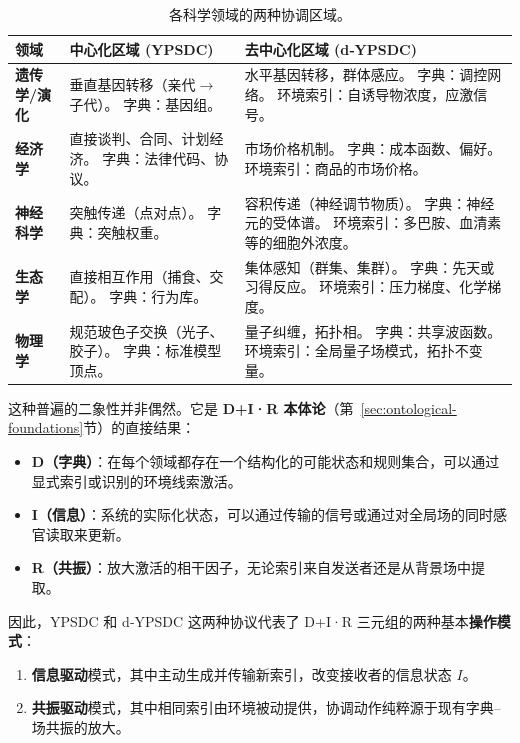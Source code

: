 \documentclass[11pt,a4paper]{article}
\begin{document}
	\begin{table}[htbp]
		\centering
		\caption{各科学领域的两种协调区域。}
		\label{tab:two-regimes-sciences}
		\large
		\begin{tabular}{p{3.0cm}p{5.5cm}p{6.5cm}}
			\toprule
			\textbf{领域} & \textbf{中心化区域 (YPSDC)} & \textbf{去中心化区域 (d‑YPSDC)} \\
			\midrule
			\textbf{遗传学/演化} &
			垂直基因转移（亲代$\to$子代）。
			字典：基因组。 &
			水平基因转移，群体感应。
			字典：调控网络。
			环境索引：自诱导物浓度，应激信号。 \\
			\midrule
			\textbf{经济学} &
			直接谈判、合同、计划经济。
			字典：法律代码、协议。 &
			市场价格机制。
			字典：成本函数、偏好。
			环境索引：商品的市场价格。 \\
			\midrule
			\textbf{神经科学} &
			突触传递（点对点）。
			字典：突触权重。 &
			容积传递（神经调节物质）。
			字典：神经元的受体谱。
			环境索引：多巴胺、血清素等的细胞外浓度。 \\
			\midrule
			\textbf{生态学} &
			直接相互作用（捕食、交配）。
			字典：行为库。 &
			集体感知（群集、集群）。
			字典：先天或习得反应。
			环境索引：压力梯度、化学梯度。 \\
			\midrule
			\textbf{物理学} &
			规范玻色子交换（光子、胶子）。
			字典：标准模型顶点。 &
			量子纠缠，拓扑相。
			字典：共享波函数。
			环境索引：全局量子场模式，拓扑不变量。 \\
			\bottomrule
		\end{tabular}
	\end{table}
	
	\medskip
	\noindent
	这种普遍的二象性并非偶然。它是 \textbf{D+I·R 本体论}（第~\ref{sec:ontological-foundations}节）的直接结果：
	\begin{itemize}[leftmargin=*]
		\item \textbf{D（字典）}：在每个领域都存在一个结构化的可能状态和规则集合，可以通过显式索引或识别的环境线索激活。
		\item \textbf{I（信息）}：系统的实际化状态，可以通过传输的信号或通过对全局场的同时感官读取来更新。
		\item \textbf{R（共振）}：放大激活的相干因子，无论索引来自发送者还是从背景场中提取。
	\end{itemize}
	
	因此，YPSDC 和 d‑YPSDC 这两种协议代表了 D+I·R 三元组的两种基本\textbf{操作模式}：
	\begin{enumerate}[leftmargin=*]
		\item \textbf{信息驱动}模式，其中主动生成并传输新索引，改变接收者的信息状态 \(I\)。
		\item \textbf{共振驱动}模式，其中相同索引由环境被动提供，协调动作纯粹源于现有字典–场共振的放大。
	\end{enumerate}
	
\end{document}
